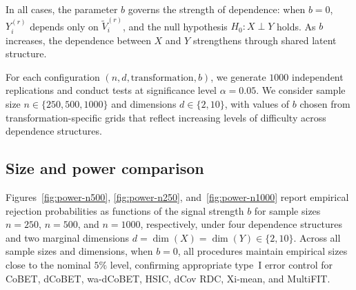 \documentclass[12pt,reqno,oneside]{amsbook}
\theoremstyle{definition}
\theoremstyle{remark}
\begin{document}
In all cases, the parameter $b$ governs the strength of dependence: when $b=0$,
$Y_i^{(r)}$ depends only on $\tilde V_i^{(r)}$, and the null hypothesis
$H_0:X\perp Y$ holds. As $b$ increases, the dependence between $X$ and $Y$
strengthens through shared latent structure.

For each configuration $(n,d,\text{transformation},b)$, we generate $1000$
independent replications and conduct tests at significance level
$\alpha=0.05$. We consider sample size $n\in \{250,500, 1000\}$ and dimensions
$d\in\{2,10\}$, with values of $b$ chosen from transformation-specific grids
that reflect increasing levels of difficulty across dependence structures.

\subsection{Size and power comparison}
\label{subsec:size-power}

Figures~\ref{fig:power-n500}, \ref{fig:power-n250}, and~\ref{fig:power-n1000}
report empirical rejection probabilities as functions of the signal strength $b$
for sample sizes $n=250$, $n=500$, and $n=1000$, respectively, under four
dependence structures and two marginal dimensions
$d=\dim(X)=\dim(Y)\in\{2,10\}$. Across all sample sizes and dimensions, when
$b=0$, all procedures maintain empirical sizes close to the nominal $5\%$ level,
confirming appropriate type~I error control for CoBET, dCoBET, wa-dCoBET, HSIC, dCov RDC, Xi-mean, and MultiFIT.



\end{document}
